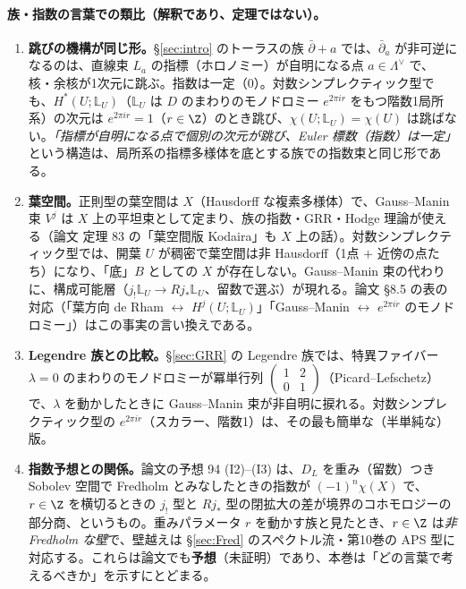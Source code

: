 \paragraph{族・指数の言葉での類比（解釈であり、定理ではない）。}
\begin{enumerate}
\item \textbf{跳びの機構が同じ形。}\S\ref{sec:intro} のトーラスの族 $\bar\partial+a$ では、$\bar\partial_a$ が非可逆になるのは、直線束 $L_a$ の指標（ホロノミー）が自明になる点 $a\in\Lambda^\vee$ で、核・余核が1次元に跳ぶ。指数は一定（$0$）。対数シンプレクティック型でも、$H^*(U;\mathbb L_U)$（$\mathbb L_U$ は $D$ のまわりのモノドロミー $e^{2\pi ir}$ をもつ階数1局所系）の次元は $e^{2\pi ir}=1$（$r\in\Z$）のとき跳び、$\chi(U;\mathbb L_U)=\chi(U)$ は跳ばない。\emph{「指標が自明になる点で個別の次元が跳び、Euler 標数（指数）は一定」}という構造は、局所系の指標多様体を底とする族での指数束と同じ形である。
\item \textbf{葉空間。}正則型の葉空間は $X$（Hausdorff な複素多様体）で、Gauss--Manin 束 $V^j$ は $X$ 上の平坦束として定まり、族の指数・GRR・Hodge 理論が使える（論文 定理 83 の「葉空間版 Kodaira」も $X$ 上の話）。対数シンプレクティック型では、開葉 $U$ が稠密で葉空間は非 Hausdorff（1点 $+$ 近傍の点たち）になり、「底」$B$ としての $X$ が存在しない。Gauss--Manin 束の代わりに、構成可能層（$j_!\mathbb L_U\to Rj_*\mathbb L_U$、留数で選ぶ）が現れる。論文 §8.5 の表の対応（「葉方向 de Rham $\leftrightarrow$ $H^j(U;\mathbb L_U)$」「Gauss--Manin $\leftrightarrow$ $e^{2\pi ir}$ のモノドロミー」）はこの事実の言い換えである。
\item \textbf{Legendre 族との比較。}\S\ref{sec:GRR} の Legendre 族では、特異ファイバー $\lambda=0$ のまわりのモノドロミーが冪単行列 $\begin{pmatrix}1&2\\0&1\end{pmatrix}$（Picard--Lefschetz）で、$\lambda$ を動かしたときに Gauss--Manin 束が非自明に捩れる。対数シンプレクティック型の $e^{2\pi ir}$（スカラー、階数1）は、その最も簡単な（半単純な）版。
\item \textbf{指数予想との関係。}論文の予想 94 (I2)--(I3) は、$D_L$ を重み（留数）つき Sobolev 空間で Fredholm とみなしたときの指数が $(-1)^n\chi(X)$ で、$r\in\Z$ を横切るときの $j_!$ 型と $Rj_*$ 型の閉拡大の差が境界のコホモロジーの部分商、というもの。重みパラメータ $r$ を動かす族と見たとき、$r\in\Z$ は\emph{非 Fredholm な壁}で、壁越えは \S\ref{sec:Fred} のスペクトル流・第10巻の APS 型に対応する。これらは論文でも\textbf{予想}（未証明）であり、本巻は「どの言葉で考えるべきか」を示すにとどまる。
\end{enumerate}
